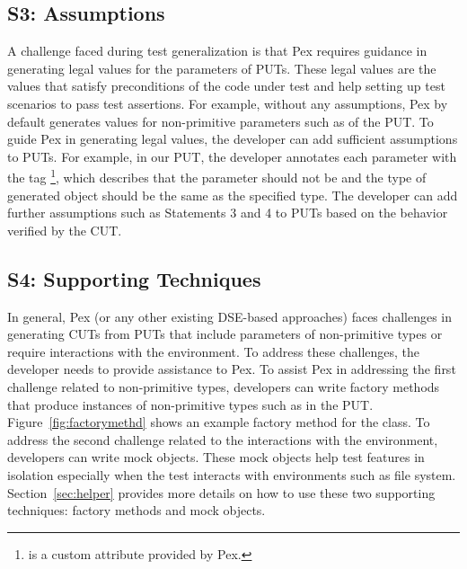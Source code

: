\subsection{S3: Assumptions}

A challenge faced during test generalization is that Pex requires guidance in generating legal values for the parameters of PUTs. These legal values are the values that satisfy preconditions of the code under test and help setting up test scenarios to pass test assertions. For example, without any assumptions, Pex by default generates  values for non-primitive parameters such as  of the PUT. To guide Pex in generating legal values, the developer can add sufficient assumptions to PUTs. For example, in our PUT, the developer annotates each parameter with the tag \footnote{ is a custom attribute provided by Pex.}, which describes that the parameter should not be  and the type of generated object should be the same as the specified type. The developer can add further assumptions such as Statements 3 and 4 to PUTs based on the behavior verified by the CUT.

\subsection{S4: Supporting Techniques}

In general, Pex (or any other existing DSE-based approaches) faces challenges in generating CUTs from PUTs that include parameters of non-primitive types or require interactions with the environment. To address these challenges, the developer needs to provide assistance to Pex. To assist Pex in addressing the first challenge related to non-primitive types, developers can write factory methods that produce instances of non-primitive types such as  in the PUT. Figure~\ref{fig:factorymethd} shows an example factory method for the  class. To address the second challenge related to the interactions with the environment, developers can write mock objects. These mock objects help test features in isolation especially when the test interacts with environments such as file system. Section~\ref{sec:helper} provides more details on how to use these two supporting techniques: factory methods and mock objects.

